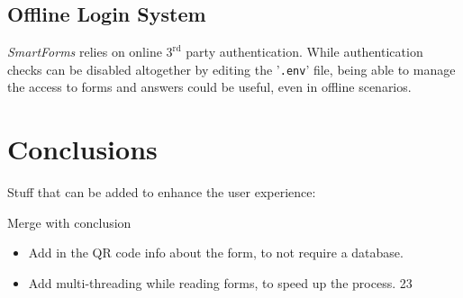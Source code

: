 \documentclass[11pt, a4paper]{report}
\def\code#1{\texttt{#1}}
\begin{document}
\subsection{Offline Login System}

\textit{SmartForms} relies on online $3^\textrm{rd}$ party authentication. While authentication checks can be disabled altogether by editing the '\code{.env}' file, being able to manage the access to forms and answers could be useful, even in offline scenarios.

\section{Conclusions}

Stuff that can be added to enhance the user experience:

Merge with conclusion

\begin{itemize}
    \item Add in the QR code info about the form, to not require a database.
    \item Add multi-threading while reading forms, to speed up the process. 23
\end{itemize}
\end{document}
